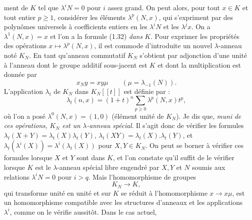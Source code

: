 ment de $K$ tel que $\lambda^iN=0$ pour $i$ assez grand. On peut alors, pour tout $x\in K$ et tout entier $p\geq1$, considérer les éléments $\lambda^p(N,x)$, qui s'expriment par des polynômes universels à coefficients entiers en les $\lambda^iN$ et les $\lambda^jx$. On a $\lambda^1(N,x)=x$ et l'on a la formule (1.32) \emph{dans} $K$. Pour exprimer les propriétés des opérations $x\mapsto\lambda^p(N,x)$, il est commode d'introduite un nouvel $\lambda$-anneau noté $K_N$. En tant qu'anneau commutatif $K_N$ s'obtient par adjonction d'une unité à l'anneau dont le groupe additif sous-jacent est $K$ et dont la multiplication est donnée par
\begin{equation}\tag{1.34}
x_Ny=xy\mu\qquad (\mu=\lambda_{-1}(N)).
\end{equation}
L'application $\lambda_t$ de $K_N$ dans $K_N[[t]]$ est définie par :
\begin{equation}\tag{1.35}
\lambda_t(n,x)=(1+t)^n\sum_{p\geq0}\lambda^p(N,x)t^p,
\end{equation}
où l'on a posé $\lambda^0(N,x)=(1,0)$ (élément unité de $K_N$). Je dis que, \emph{muni de ces opérations, $K_N$ est un $\lambda$-anneau spécial}. Il s'agit donc de vérifier les formules $\lambda_t(X+Y)=\lambda_t(X)\lambda_t(Y)$, $\lambda_t(XY)=\lambda_t(X).\lambda_t(Y)$, et $\lambda_t(\lambda^i(X))=\lambda^i(\lambda_t(X))$ pour $X,Y\in K_N$. On peut se borner à vérifier ces formules lorsque $X$ et $Y$ sont dans $K$, et l'on constate qu'il suffit de le vérifier lorsque $K$ est le $\lambda$-anneau spécial libre engendré par $X,Y$ et $N$ soumis aux relations $\lambda^iN=0$ pour $i>q$. Mais l'homomorphisme de groupes
\begin{equation}\tag{1.36}
K_N\longrightarrow K,
\end{equation}
qui transforme unité en unité et sur $K$ se réduit à l'homomorphisme $x\longrightarrow x\mu$, est un homomorphisme compatible avec les structures d'anneaux et les applications $\lambda^i$, comme on le vérifie aussitôt. Dans le cas actuel, 
